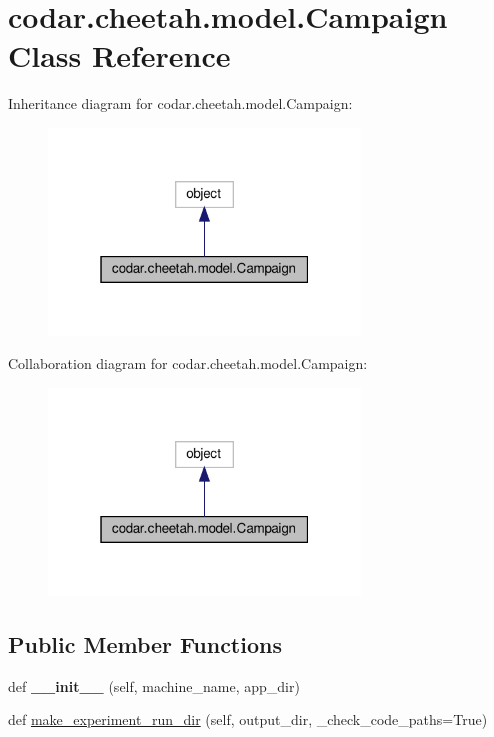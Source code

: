 \hypertarget{classcodar_1_1cheetah_1_1model_1_1_campaign}{}\section{codar.\+cheetah.\+model.\+Campaign Class Reference}
\label{classcodar_1_1cheetah_1_1model_1_1_campaign}


Inheritance diagram for codar.\+cheetah.\+model.\+Campaign\+:
\nopagebreak
\begin{figure}[H]
\begin{center}
\leavevmode
\includegraphics[width=235pt]{classcodar_1_1cheetah_1_1model_1_1_campaign__inherit__graph}
\end{center}
\end{figure}


Collaboration diagram for codar.\+cheetah.\+model.\+Campaign\+:
\nopagebreak
\begin{figure}[H]
\begin{center}
\leavevmode
\includegraphics[width=235pt]{classcodar_1_1cheetah_1_1model_1_1_campaign__coll__graph}
\end{center}
\end{figure}
\subsection*{Public Member Functions}
\begin{DoxyCompactItemize}
\item 
\mbox{\label{classcodar_1_1cheetah_1_1model_1_1_campaign_ad1b15b5ae37794b2568fe8460f36eab6}} 
def {\bfseries \+\_\+\+\_\+init\+\_\+\+\_\+} (self, machine\+\_\+name, app\+\_\+dir)
\item 
def \hyperlink{classcodar_1_1cheetah_1_1model_1_1_campaign_a09266b3421f37a82d8e12c1272e3f54b}{make\+\_\+experiment\+\_\+run\+\_\+dir} (self, output\+\_\+dir, \+\_\+check\+\_\+code\+\_\+paths=True)
\end{DoxyCompactItemize}
